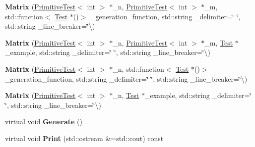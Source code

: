 \begin{DoxyCompactItemize}
\item 
\mbox{\label{class_matrix_af9148d60414731669dac225834d8bed4}} 
{\bfseries Matrix} (\hyperlink{class_primitive_test}{Primitive\+Test}$<$ int $>$ $\ast$\+\_\+n, \hyperlink{class_primitive_test}{Primitive\+Test}$<$ int $>$ $\ast$\+\_\+m, std\+::function$<$ \hyperlink{class_test}{Test} $\ast$()$>$ \+\_\+generation\+\_\+function, std\+::string \+\_\+delimiter=\char`\"{} \char`\"{}, std\+::string \+\_\+line\+\_\+breaker=\char`\"{}\textbackslash{})
\item 
\mbox{\label{class_matrix_a2d3097d07161be83f5a8d7f7609d57d7}} 
{\bfseries Matrix} (\hyperlink{class_primitive_test}{Primitive\+Test}$<$ int $>$ $\ast$\+\_\+n, \hyperlink{class_primitive_test}{Primitive\+Test}$<$ int $>$ $\ast$\+\_\+m, \hyperlink{class_test}{Test} $\ast$\+\_\+example, std\+::string \+\_\+delimiter=\char`\"{} \char`\"{}, std\+::string \+\_\+line\+\_\+breaker=\char`\"{}\textbackslash{})
\item 
\mbox{\label{class_matrix_a05fd5e85605d0c204f25c345b3a95e73}} 
{\bfseries Matrix} (\hyperlink{class_primitive_test}{Primitive\+Test}$<$ int $>$ $\ast$\+\_\+n, std\+::function$<$ \hyperlink{class_test}{Test} $\ast$()$>$ \+\_\+generation\+\_\+function, std\+::string \+\_\+delimiter=\char`\"{} \char`\"{}, std\+::string \+\_\+line\+\_\+breaker=\char`\"{}\textbackslash{})
\item 
\mbox{\label{class_matrix_adc02dd10e346d973f7c10eedb03df3dc}} 
{\bfseries Matrix} (\hyperlink{class_primitive_test}{Primitive\+Test}$<$ int $>$ $\ast$\+\_\+n, \hyperlink{class_test}{Test} $\ast$\+\_\+example, std\+::string \+\_\+delimiter=\char`\"{} \char`\"{}, std\+::string \+\_\+line\+\_\+breaker=\char`\"{}\textbackslash{})
\item 
\mbox{\label{class_matrix_ae0423e35c644fa22733a4333e5bbbdbd}} 
virtual void {\bfseries Generate} ()
\item 
\mbox{\label{class_matrix_a73e84f4b1db2fec828c81028b808510d}} 
virtual void {\bfseries Print} (std\+::ostream \&=std\+::cout) const
\item 
\mbox{\label{class_matrix_aa5d036db7285113f78f23ba52e2181a3}} 

\end{DoxyCompactItemize}

